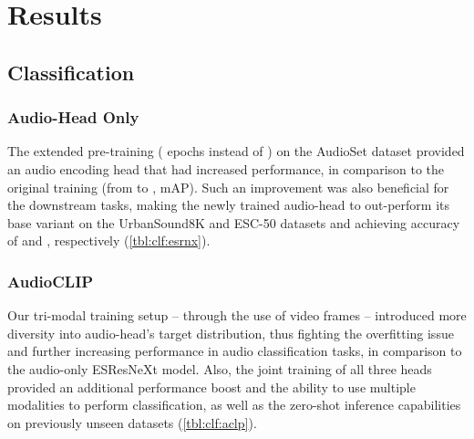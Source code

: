 \documentclass[runningheads]{llncs}
\begin{document}
\section{Results} \label{sec:results}

\subsection{Classification} \label{sec:results:clf}

\subsubsection{Audio-Head Only} \label{sec:results:clf:ah}

The extended pre-training ( epochs instead of ) on the \mbox{AudioSet} dataset provided an audio encoding head that had increased performance, in comparison to the original training (from  to , mAP).
Such an improvement was also beneficial for the downstream tasks, making the newly trained audio-head to out-perform its base variant on the \mbox{UrbanSound8K} and \mbox{ESC-50} datasets and achieving accuracy of  and , respectively (\autoref{tbl:clf:esrnx}).

\subsubsection{AudioCLIP} \label{sec:results:clf:audioclip}

Our tri-modal training setup -- through the use of video frames -- introduced more diversity into audio-head's target distribution, thus fighting the overfitting issue and further increasing performance in audio classification tasks, in comparison to the audio-only \mbox{ESResNeXt} model.
Also, the joint training of all three heads provided an additional performance boost and the ability to use multiple modalities to perform classification, as well as the zero-shot inference capabilities on previously unseen datasets (\autoref{tbl:clf:aclp}).
\end{document}
